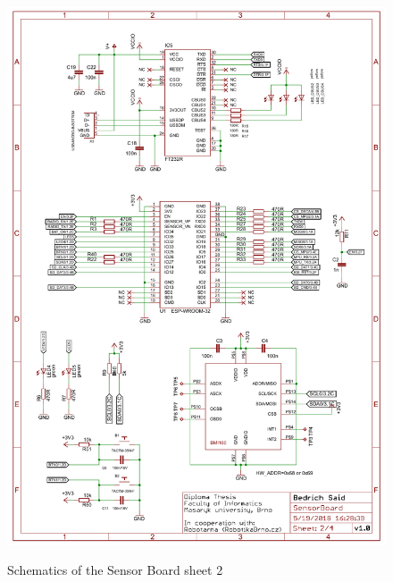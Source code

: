 \begin{figure}[H]
	\centering
	\includegraphics[angle=90, scale=1]{img/sch2.pdf}
	\label{sch2}
	\caption{Schematics of the Sensor Board sheet 2}
\end{figure}

